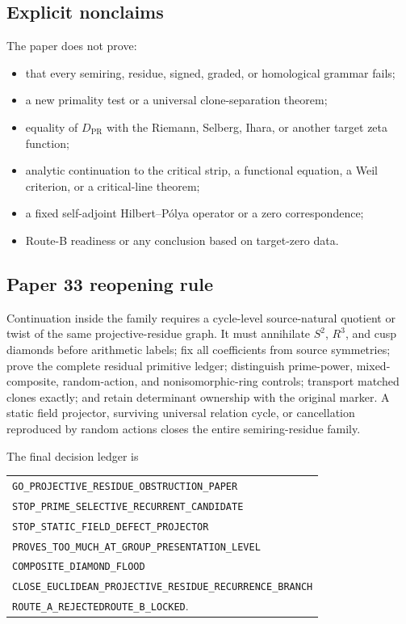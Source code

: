 \subsection{Explicit nonclaims}

The paper does not prove:
\begin{itemize}
  \item that every semiring, residue, signed, graded, or homological grammar
  fails;
  \item a new primality test or a universal clone-separation theorem;
  \item equality of $D_{\mathrm{PR}}$ with the Riemann, Selberg, Ihara, or
  another target zeta function;
  \item analytic continuation to the critical strip, a functional equation,
  a Weil criterion, or a critical-line theorem;
  \item a fixed self-adjoint Hilbert--P\'olya operator or a zero
  correspondence;
  \item Route-B readiness or any conclusion based on target-zero data.
\end{itemize}

\subsection{Paper 33 reopening rule}

Continuation inside the family requires a cycle-level source-natural quotient
or twist of the same projective-residue graph.  It must annihilate $S^2$,
$R^3$, and cusp diamonds before arithmetic labels; fix all coefficients from
source symmetries; prove the complete residual primitive ledger; distinguish
prime-power, mixed-composite, random-action, and nonisomorphic-ring controls;
transport matched clones exactly; and retain determinant ownership with the
original marker.  A static field projector, surviving universal relation
cycle, or cancellation reproduced by random actions closes the entire
semiring-residue family.

The final decision ledger is
\begin{center}
\begin{tabular}{l}
\texttt{GO\_PROJECTIVE\_RESIDUE\_OBSTRUCTION\_PAPER}\\
\texttt{STOP\_PRIME\_SELECTIVE\_RECURRENT\_CANDIDATE}\\
\texttt{STOP\_STATIC\_FIELD\_DEFECT\_PROJECTOR}\\
\texttt{PROVES\_TOO\_MUCH\_AT\_GROUP\_PRESENTATION\_LEVEL}\\
\texttt{COMPOSITE\_DIAMOND\_FLOOD}\\
\texttt{CLOSE\_EUCLIDEAN\_PROJECTIVE\_RESIDUE\_RECURRENCE\_BRANCH}\\
\texttt{ROUTE\_A\_REJECTED}\qquad\texttt{ROUTE\_B\_LOCKED}.
\end{tabular}
\end{center}
